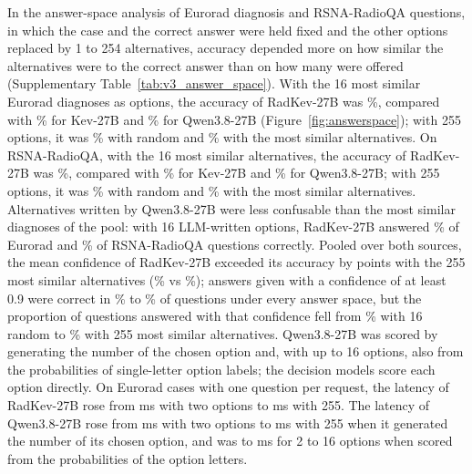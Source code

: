 In the answer-space analysis of  Eurorad diagnosis and  RSNA-RadioQA questions, in which the case and the correct answer were held fixed and the other options replaced by 1 to 254 alternatives, accuracy depended more on how similar the alternatives were to the correct answer than on how many were offered (Supplementary Table~\ref{tab:v3_answer_space}). With the 16 most similar Eurorad diagnoses as options, the accuracy of RadKev-27B was \%, compared with \% for Kev-27B and \% for Qwen3.8-27B (Figure~\ref{fig:answerspace}); with 255 options, it was \% with random and \% with the most similar alternatives. On RSNA-RadioQA, with the 16 most similar alternatives, the accuracy of RadKev-27B was \%, compared with \% for Kev-27B and \% for Qwen3.8-27B; with 255 options, it was \% with random and \% with the most similar alternatives. Alternatives written by Qwen3.8-27B were less confusable than the most similar diagnoses of the pool: with 16 LLM-written options, RadKev-27B answered \% of  Eurorad and \% of  RSNA-RadioQA questions correctly. Pooled over both sources, the mean confidence of RadKev-27B exceeded its accuracy by  points with the 255 most similar alternatives (\% vs \%); answers given with a confidence of at least 0.9 were correct in \% to \% of questions under every answer space, but the proportion of questions answered with that confidence fell from \% with 16 random to \% with 255 most similar alternatives. %
Qwen3.8-27B was scored by generating the number of the chosen option and, with up to 16 options, also from the probabilities of single-letter option labels; the decision models score each option directly. On  Eurorad cases with one question per request, the latency of RadKev-27B rose from  ms with two options to  ms with 255. The latency of Qwen3.8-27B rose from  ms with two options to  ms with 255 when it generated the number of its chosen option, and was  to  ms for 2 to 16 options when scored from the probabilities of the option letters. %

